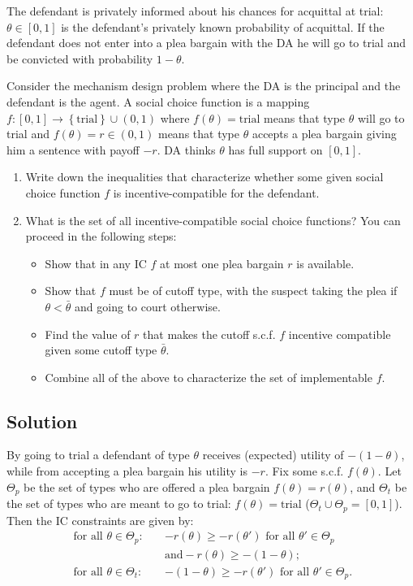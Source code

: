 \documentclass[a4paper]{article}
\newif\ifsolutions
\begin{document}
The defendant is privately informed about his chances for acquittal at trial:  $\theta\in [0,1]$ is the defendant's privately known probability of acquittal.  If the defendant does not enter into a plea bargain with the DA he will go to trial and be convicted with probability $1 - \theta$.

Consider the mechanism design problem where the DA is the principal and the defendant is the agent.  A social choice function is a mapping $f:[0,1] \rightarrow \left\{ \text{trial} \right\} \cup (0,1)$ where $f(\theta) = \text{trial}$ means that type $\theta$ will go to trial and $f(\theta) = r \in (0,1)$ means that type $\theta$ accepts a plea bargain giving him a sentence with payoff $-r$. DA thinks $\theta$ has full support on $[0,1]$.

\begin{enumerate}
	\item Write down the inequalities that characterize whether some given social choice function $f$ is incentive-compatible	for the defendant.
	\item What is the set of all incentive-compatible social choice functions?
	You can proceed in the following steps:
	\begin{itemize}
		\item Show that in any IC $f$ at most one plea bargain $r$ is available.
		\item Show that $f$ must be of cutoff type, with the suspect taking the plea if $\theta < \bar{\theta}$ and going to court otherwise.
		\item Find the value of $r$ that makes the cutoff s.c.f. $f$ incentive compatible given some cutoff type $\bar{\theta}$.
		\item Combine all of the above to characterize the set of implementable $f$.
	\end{itemize}
\end{enumerate}


\ifsolutions
\subsection*{Solution}
By going to trial a defendant of type $\theta$ receives (expected) utility of $-(1-\theta)$, while from accepting a plea bargain his utility is $-r$. 
Fix some s.c.f. $f(\theta)$. Let $\Theta_p$ be the set of types who are offered a plea bargain $f(\theta) = r(\theta)$, and $\Theta_t$ be the set of types who are meant to go to trial: $f(\theta) = \text{trial}$ ($\Theta_t \cup \Theta_p = [0,1]$). Then the IC constraints are given by:
\begin{align*}
	\text{ for all } \theta \in \Theta_p: \quad&-r(\theta) \geq -r(\theta') \text{ for all } \theta' \in \Theta_p
	\\
	& \text{and}  -r(\theta) \geq -(1-\theta);
	\\
	\text{ for all } \theta \in \Theta_t: \quad& -(1-\theta) \geq -r(\theta') \text{ for all } \theta' \in \Theta_p.
\end{align*}
\end{document}
